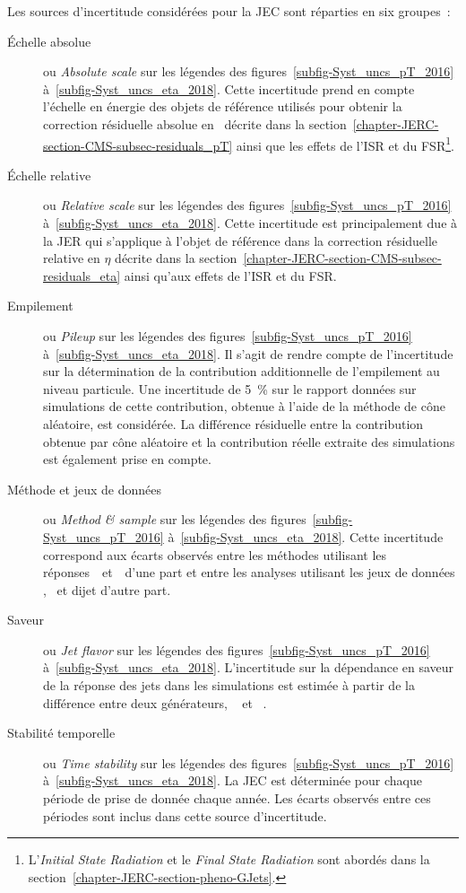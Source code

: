 Les sources d'incertitude considérées pour la JEC sont réparties en six groupes~\cite{CMS-DP-2020-019}:
\begin{description}
\item[Échelle absolue] ou \emph{Absolute scale} sur les légendes des figures~\ref{subfig-Syst_uncs_pT_2016} à~\ref{subfig-Syst_uncs_eta_2018}.
Cette incertitude prend en compte l'échelle en énergie des objets de référence utilisés pour obtenir la correction résiduelle absolue en \pT\ décrite dans la section~\ref{chapter-JERC-section-CMS-subsec-residuals_pT} ainsi que les effets de l'ISR et du FSR\footnote{L'\emph{Initial State Radiation} et le \emph{Final State Radiation} sont abordés dans la section~\ref{chapter-JERC-section-pheno-GJets}.}.
\item[Échelle relative] ou \emph{Relative scale} sur les légendes des figures~\ref{subfig-Syst_uncs_pT_2016} à~\ref{subfig-Syst_uncs_eta_2018}.
Cette incertitude est principalement due à la JER qui s'applique à l'objet de référence dans la correction résiduelle relative en $\eta$ décrite dans la section~\ref{chapter-JERC-section-CMS-subsec-residuals_eta} ainsi qu'aux effets de l'ISR et du FSR.
\item[Empilement] ou \emph{Pileup} sur les légendes des figures~\ref{subfig-Syst_uncs_pT_2016} à~\ref{subfig-Syst_uncs_eta_2018}.
Il s'agit de rendre compte de l'incertitude sur la détermination de la contribution additionnelle de l'empilement au niveau particule.
Une incertitude de \SI{5}{\%} sur le rapport données sur simulations de cette contribution, obtenue à l'aide de la méthode de cône aléatoire, est considérée.
La différence résiduelle entre la contribution obtenue par cône aléatoire et la contribution réelle extraite des simulations est également prise en compte.
\item[Méthode et jeux de données] ou \emph{Method \& sample} sur les légendes des figures~\ref{subfig-Syst_uncs_pT_2016} à~\ref{subfig-Syst_uncs_eta_2018}.
Cette incertitude correspond aux écarts observés entre les méthodes utilisant les réponses~\Rbal\ et~\RMPF\ d'une part et entre les analyses utilisant les jeux de données \Zjets, \Gjets\ et dijet d'autre part.
\item[Saveur] ou \emph{Jet flavor} sur les légendes des figures~\ref{subfig-Syst_uncs_pT_2016} à~\ref{subfig-Syst_uncs_eta_2018}.
L'incertitude sur la dépendance en saveur de la réponse des jets dans les simulations est estimée à partir de la différence entre deux générateurs,
\PYTHIA~\cite{pythia6.4}
et
\HERWIG~\cite{herwig}.
\item[Stabilité temporelle] ou \emph{Time stability} sur les légendes des figures~\ref{subfig-Syst_uncs_pT_2016} à~\ref{subfig-Syst_uncs_eta_2018}.
La JEC est déterminée pour chaque période de prise de donnée chaque année. Les écarts observés entre ces périodes sont inclus dans cette source d'incertitude.
\end{description}
